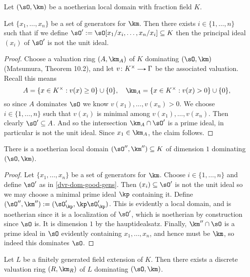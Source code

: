 \begin{nothing}
  \label{dvr-dom}
  Let $(\sO,\km)$ be a noetherian local domain with fraction field $K$.

  \begin{sublemma}
    \label{dvr-dom-good-gens}
    Let $\{x_1,\ldots,x_n\}$ be a set of generators for $\km$. Then there exists $i \in \{1,\ldots,n\}$ such that if we define $\sO' \ce \sO[x_1/x_i,\ldots,x_n/x_i] \subseteq K$ then the principal ideal $(x_i)$ of $\sO'$ is not the unit ideal.

    \begin{proof}
      Choose a valuation ring $(A,\km_A)$ of $K$ dominating $(\sO,\km)$ (Matsumura, Theorem 10.2), and let $v \c K^\times \to \Gamma$ be the associated valuation. Recall this means
      \[
        A = \{x \in K^\times : v(x) \ge 0\} \cup \{0\}, \quad
        \km_A = \{x \in K^\times : v(x) > 0\} \cup \{0\},
      \]
      so since $A$ dominates $\sO$ we know $v(x_1),\ldots,v(x_n) > 0$. We choose $i \in \{1,\ldots,n\}$ such that $v(x_i)$ is minimal among $v(x_1),\ldots,v(x_n)$. Then clearly $\sO' \subseteq A$. And so the intersection $\km_A \cap \sO'$ is a prime ideal, in particular is not the unit ideal. Since $x_1 \in \km_A$, the claim follows.
    \end{proof}
  \end{sublemma}

  \begin{sublemma}
    \label{dvr-dom-dim-1}
    There is a noetherian local domain $(\sO'',\km'') \subseteq K$ of dimension $1$ dominating $(\sO,\km)$.

    \begin{proof}
      Let $\{x_1,\ldots,x_n\}$ be a set of generators for $\km$. Choose $i \in \{1,\ldots,n\}$ and define $\sO'$ as in \cref{dvr-dom-good-gens}. Then $(x_i) \subseteq \sO'$ is not the unit ideal so we may choose a minimal prime ideal $\kp$ containing it. Define $(\sO'',\km'') \ce (\sO'_\kp,\kp\sO'_\kp)$. This is evidently a local domain, and is noetherian since it is a localization of $\sO'$, which is noetherian by construction since $\sO$ is. It is dimension $1$ by the hauptidealsatz. Finally, $\km'' \cap \sO$ is a prime ideal in $\sO$ evidently containing $x_1,\ldots,x_n$, and hence must be $\km$, so indeed this dominates $\sO$.
    \end{proof}
  \end{sublemma}

  \begin{subproposition}
    \label{dvr-dom-krull-akizuki}
    Let $L$ be a finitely generated field extension of $K$. Then there exists a discrete valuation ring $(R,\km_R)$ of $L$ dominating $(\sO,\km)$.


\end{subproposition}
\end{nothing}
